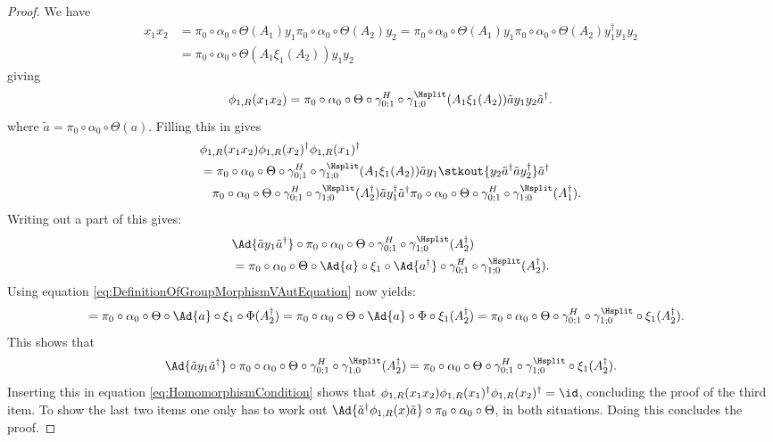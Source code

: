 \begin{proof}
	We have
	\begin{align}
		x_1x_2&=\pi_0\circ\alpha_0\circ\Theta(A_1)y_1\pi_0\circ\alpha_0\circ\Theta(A_2)y_2=\pi_0\circ\alpha_0\circ\Theta(A_1)y_1\pi_0\circ\alpha_0\circ\Theta(A_2)y_1^{\dagger}y_1y_2\\
		\nonumber
		&=\pi_0\circ\alpha_0\circ\Theta(A_1\xi_1(A_2))y_1y_2
	\end{align}
	giving
	\begin{equation}
		\phi_{1,R}(x_1x_2)=\pi_0\circ\alpha_0\circ\Theta\circ\gamma^H_{0;1}\circ\gamma^{\Hsplit}_{1;0}(A_1\xi_1(A_2))\tilde{a}y_1y_2\tilde{a}^\dagger.
	\end{equation}
	where $\tilde{a}=\pi_0\circ\alpha_0\circ\Theta(a)$. Filling this in gives
	\begin{align}
		\nonumber
		&\phi_{1,R}(x_1x_2)\phi_{1,R}(x_2)^\dagger\phi_{1,R}(x_1)^\dagger\\
		\label{eq:HomomorphismCondition}
		&=\pi_0\circ\alpha_0\circ\Theta\circ\gamma^H_{0;1}\circ\gamma^{\Hsplit}_{1;0}(A_1\xi_1(A_2))\tilde{a}y_1\stkout{y_2\tilde{a}^\dagger \tilde{a}y_2^\dagger}\tilde{a}^\dagger\\
		\nonumber
		&\quad\pi_0\circ\alpha_0\circ\Theta\circ\gamma^H_{0;1}\circ\gamma^{\Hsplit}_{1;0}(A_2^\dagger)\tilde{a}y_1^\dagger\tilde{a}^\dagger \pi_0\circ\alpha_0\circ\Theta\circ\gamma^H_{0;1}\circ\gamma^{\Hsplit}_{1;0}(A_1^\dagger).
	\end{align}
	Writing out a part of this gives:
	\begin{align}
		&\Ad{\tilde{a}y_1\tilde{a}^\dagger}\circ\pi_0\circ\alpha_0\circ\Theta\circ\gamma^H_{0;1}\circ\gamma^{\Hsplit}_{1;0}(A_2^\dagger)\\
		\nonumber
		&=\pi_0\circ\alpha_0\circ\Theta\circ\Ad{a}\circ\xi_1\circ\Ad{a^\dagger}\circ\gamma^H_{0;1}\circ\gamma^{\Hsplit}_{1;0}(A_2^\dagger).
	\end{align}
	Using equation \eqref{eq:DefinitionOfGroupMorphismVAutEquation} now yields:
	\begin{align}
		&=\pi_0\circ\alpha_0\circ\Theta\circ\Ad{a}\circ\xi_1\circ\Phi(A_2^\dagger)=\pi_0\circ\alpha_0\circ\Theta\circ\Ad{a}\circ\Phi\circ\xi_1(A_2^\dagger)=\pi_0\circ\alpha_0\circ\Theta\circ\gamma^H_{0;1}\circ\gamma^{\Hsplit}_{1;0}\circ\xi_1(A_2^\dagger).
	\end{align}
	This shows that
	\begin{equation}
		\Ad{\tilde{a}y_1\tilde{a}^\dagger}\circ\pi_0\circ\alpha_0\circ\Theta\circ\gamma^H_{0;1}\circ\gamma^{\Hsplit}_{1;0}(A_2^\dagger)=\pi_0\circ\alpha_0\circ\Theta\circ\gamma^H_{0;1}\circ\gamma^{\Hsplit}_{1;0}\circ\xi_1(A_2^\dagger).
	\end{equation}
	Inserting this in equation \eqref{eq:HomomorphismCondition} shows that $\phi_{1,R}(x_1x_2)\phi_{1,R}(x_1)^\dagger\phi_{1,R}(x_2)^\dagger=\id$, concluding the proof of the third item. To show the last two items one only has to work out $\Ad{\tilde{a}^\dagger \phi_{1,R}(x)\tilde{a}}\circ\pi_0\circ\alpha_0\circ\Theta$, in both situations. Doing this concludes the proof.
\end{proof}

